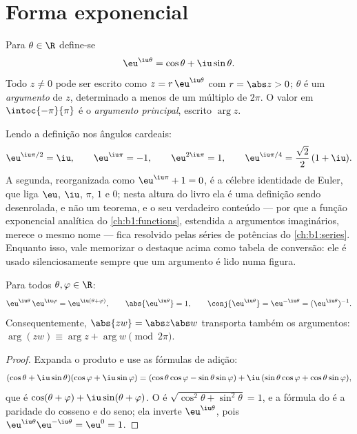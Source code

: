 \section{Forma exponencial}

\begin{definition}\label{def:b1:complex:expi}
Para $\theta \in \R$ define-se
\[
\eu^{\iu\theta} = \cos\theta + \iu \sin\theta .
\]
Todo $z \neq 0$ pode ser escrito como $z = r\,\eu^{\iu\theta}$ com $r =
\abs z > 0$; $\theta$ é um \emph{argumento} de $z$,
determinado a menos de um múltiplo de $2\pi$. O valor em
$\intoc{-\pi}{\pi}$ é o \emph{argumento principal}, escrito
$\arg z$.
\end{definition}

\begin{example}\label{ex:b1:complex:eulerid}
Lendo a definição nos ângulos cardeais:
\[
\eu^{\iu\pi/2} = \iu, \qquad
\eu^{\iu\pi} = -1, \qquad
\eu^{2\iu\pi} = 1, \qquad
\eu^{\iu\pi/4} = \frac{\sqrt2}2\,(1 + \iu) .
\]
A segunda, reorganizada como $\eu^{\iu\pi} + 1 = 0$, é a célebre
identidade de Euler, que liga $\eu$, $\iu$, $\pi$, $1$ e $0$; nesta
altura do livro ela é uma definição sendo desenrolada, e não um
teorema, e o seu verdadeiro conteúdo --- por que a função exponencial
analítica do \cref{ch:b1:functions}, estendida a argumentos
imaginários, merece o mesmo nome --- fica resolvido pelas séries de
potências do \cref{ch:b1:series}. Enquanto isso, vale memorizar o
destaque acima como tabela de conversão: ele é usado silenciosamente
sempre que um argumento é lido numa figura.
\end{example}

\begin{theorem}\label{thm:b1:complex:funceq}
Para todos $\theta, \varphi \in \R$:
\[
\eu^{\iu\theta}\, \eu^{\iu\varphi} = \eu^{\iu(\theta + \varphi)},
\qquad
\abs{\eu^{\iu\theta}} = 1,
\qquad
\conj{\eu^{\iu\theta}} = \eu^{-\iu\theta} = (\eu^{\iu\theta})^{-1}.
\]
Consequentemente, $\abs{zw} = \abs z \abs w$ transporta também os argumentos:
$\arg(zw) \equiv \arg z + \arg w \pmod{2\pi}$.
\end{theorem}

\begin{proof}
Expanda o produto e use as fórmulas de adição:
\[
(\cos\theta + \iu\sin\theta)(\cos\varphi + \iu\sin\varphi)
= (\cos\theta\cos\varphi - \sin\theta\sin\varphi)
+ \iu\,(\sin\theta\cos\varphi + \cos\theta\sin\varphi),
\]
que é $\cos(\theta+\varphi) + \iu\sin(\theta+\varphi)$. O 
é $\sqrt{\cos^2\theta + \sin^2\theta} = 1$, e a fórmula do 
é a paridade do cosseno e do seno; ela inverte $\eu^{\iu\theta}$, pois
$\eu^{\iu\theta}\eu^{-\iu\theta} = \eu^0 = 1$.
\end{proof}

